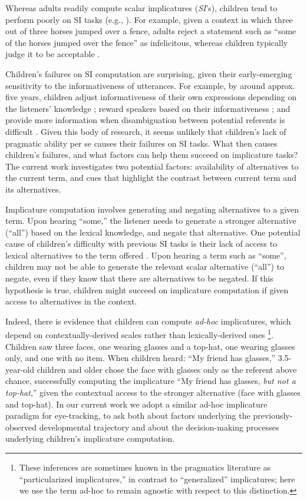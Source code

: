 \documentclass[10pt,letterpaper]{article}
\begin{document}
Whereas adults readily compute scalar implicatures (\emph{SI}'s), children tend to perform poorly on SI tasks (e.g., ). For example, given a context in which three out of three horses jumped over a fence, adults reject a statement such as ``some of the horses jumped over the fence'' as infelicitous, whereas children typically judge it to be acceptable \cite{papafragou2003scalar}. 

Children's failures on SI computation are surprising, given their early-emerging sensitivity to the informativeness of utterances. For example, by around approx. five years, children adjust informativeness of their own expressions depending on the listeners' knowledge \cite{matthews2006effect}; reward speakers based on their informativeness \cite{katsos2011pragmatic}; and provide more information when disambiguation between potential referents is difficult \cite{matthews2012two}. Given this body of research, it seems unlikely that children's lack of pragmatic ability per se causes their failures on SI tasks. What then causes children's failures, and what factors can help them succeed on implicature tasks? The current work investigates two potential factors: availability of alternatives to the current term, and cues that highlight the contrast between current term and its alternatives.

Implicature computation involves generating and negating alternatives to a given term. Upon hearing ``some,'' the listener needs to generate a stronger alternative (``all'') based on the lexical knowledge, and negate that alternative. One potential cause of children's difficulty with previous SI tasks is their lack of access to lexical alternatives to the term offered \cite{barner2011accessing}. Upon hearing a term such as ``some'', children may not be able to generate the relevant scalar alternative (``all'') to negate, even if they know that there are alternatives to be negated. If this hypothesis is true, children might succeed on implicature computation if given access to alternatives in the context.

Indeed, there is evidence that children can compute \emph{ad-hoc} implicatures, which depend on contextually-derived scales rather than lexically-derived ones \cite{stillerLLD}\footnote{These inferences are sometimes known in the pragmatics literature as ``particularized implicatures,'' in contrast to ``generalized'' implicatures; here we use the term ad-hoc to remain agnostic with respect to this distinction.}. Children saw three faces, one wearing glasses and a top-hat, one wearing glasses only, and one with no item. When children heard: ``My friend has glasses,'' 3.5-year-old children and older chose the face with glasses only as the referent above chance, successfully computing the implicature ``My friend has glasses, \emph{but not a top-hat},'' given the contextual access to the stronger alternative (face with glasses and top-hat). In our current work we adopt a similar ad-hoc implicature paradigm for eye-tracking, to ask both about factors underlying the previously-observed developmental trajectory and about the decision-making processes underlying children's implicature computation. 
\end{document}
